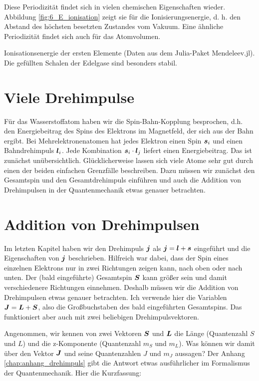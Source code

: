 Diese Periodizität findet sich in vielen chemischen Eigenschaften wieder. Abbildung \ref{fig:6_E_ionisation}
zeigt sie für die Ionisierungsenergie, d. h. den Abstand des höchsten besetzten Zustandes vom Vakuum. Eine ähnliche Periodizität findet sich auch für das Atomvolumen.

\begin{marginfigure}
    \caption{Ionisationsenergie der ersten Elemente (Daten aus dem Julia-Paket Mendeleev.jl). Die gefüllten Schalen der Edelgase sind besonders stabil.}
    \label{fig:6_E_ionisation}
\end{marginfigure}


\section{Viele Drehimpulse}


Für das Wasserstoffatom haben wir die Spin-Bahn-Kopplung besprochen, d.h. den Energiebeitrag des Spins des Elektrons im Magnetfeld, der sich aus der Bahn ergibt. Bei Mehrelektronenatomen hat jedes Elektron einen Spin $\boldsymbol{s}_i$ und einen Bahndrehimpuls $\boldsymbol{l}_i$. Jede Kombination $\boldsymbol{s}_i \cdot \boldsymbol{l}_j$ liefert einen Energiebeitrag. Das ist zunächst unübersichtlich. Glücklicherweise lassen sich viele Atome sehr gut durch einen der beiden einfachen Grenzfälle beschreiben. Dazu müssen wir zunächst den Gesamtspin und den Gesamtdrehimpuls einführen und auch die Addition von Drehimpulsen in der Quantenmechanik etwas genauer betrachten.


\section{Addition von Drehimpulsen}

Im letzten Kapitel haben wir den Drehimpuls $\boldsymbol{j}$ als $\boldsymbol{j} = \boldsymbol{l} + \boldsymbol{s}$ eingeführt und die Eigenschaften von $\boldsymbol{j}$ beschrieben. Hilfreich war dabei, dass der Spin eines einzelnen Elektrons nur in zwei Richtungen zeigen kann, nach oben oder nach unten. Der (bald eingeführte) Gesamtspin $\boldsymbol{S}$ kann größer sein und damit verschiedenere Richtungen einnehmen. Deshalb müssen wir die Addition von Drehimpulsen etwas genauer betrachten. Ich verwende hier die Variablen $\boldsymbol{J} = \boldsymbol{L} + \boldsymbol{S}$, also die Großbuchstaben des bald eingeführten Gesamtspins. Das funktioniert aber auch mit zwei beliebigen Drehimpulsvektoren.

Angenommen, wir kennen von zwei Vektoren $\boldsymbol{S}$ und $\boldsymbol{L}$ die Länge (Quantenzahl $S$ und $L$) und die z-Komponente (Quantenzahl $m_S$ und $m_L$). Was können wir damit über den Vektor $\boldsymbol{J}$ und seine Quantenzahlen $J$ und $m_J$ aussagen? Der Anhang \ref{chap:anhang_drehimpuls}
gibt die Antwort etwas ausführlicher im Formalismus der Quantenmechanik. Hier die Kurzfassung:

